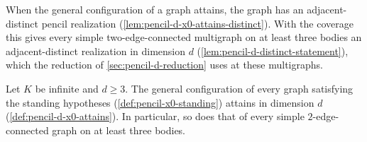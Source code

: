 When the general configuration of a graph attains, the graph has an
adjacent-distinct pencil realization
(\cref{lem:pencil-d-x0-attains-distinct}). With the coverage this gives
every simple two-edge-connected multigraph on at least three bodies an
adjacent-distinct realization in dimension $d$
(\cref{lem:pencil-d-distinct-statement}), which the reduction of
\cref{sec:pencil-d-reduction} uses at these multigraphs.

\begin{theorem}
  \label{thm:pencil-d-coverage}
  \leanok
  Let $K$ be infinite and $d \ge 3$. The general configuration of every
  graph satisfying the standing hypotheses
  (\cref{def:pencil-x0-standing}) attains in dimension $d$
  (\cref{def:pencil-d-x0-attains}). In particular, so does that of every
  simple $2$-edge-connected graph on at least three bodies.
\end{theorem}
